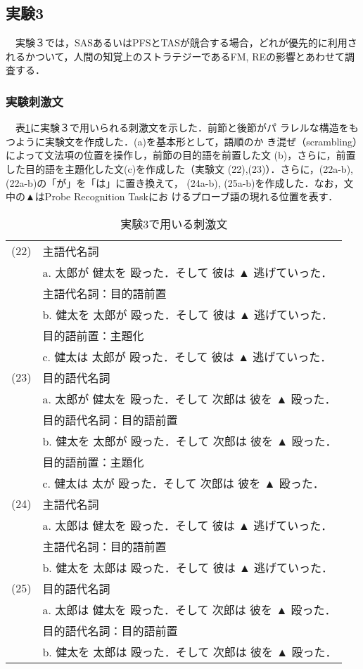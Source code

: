 \subsection{実験3}
　実験３では，SASあるいはPFSとTASが競合する場合，どれが優先的に利用さ
れるかついて，人間の知覚上のストラテジーであるFM, REの影響とあわせて調
査する．

\subsubsection{実験刺激文}
　表\ref{table:exam3s}に実験３で用いられる刺激文を示した．前節と後節がパ
ラレルな構造をもつように実験文を作成した．(a)を基本形として，語順のか
き混ぜ（scrambling）によって文法項の位置を操作し，前節の目的語を前置した文
(b)，さらに，前置した目的語を主題化した文(c)を作成した（実験文
(22),(23)）．さらに，(22a-b),(22a-b)の「が」を「は」に置き換えて，
(24a-b), (25a-b)を作成した．なお，文中の▲はProbe Recognition Taskにお
けるプローブ語の現れる位置を表す．

\begin{table}[htbp]

\caption{実験3で用いる刺激文}
\label{table:exam3s}
\begin{center}
\begin{tabular}{cl} \hline
(22) &主語代名詞\\
     & a. 太郎が 健太を 殴った．そして 彼は ▲ 逃げていった．\\
     &主語代名詞：目的語前置\\
     & b. 健太を 太郎が 殴った．そして 彼は ▲ 逃げていった．\\
     &目的語前置：主題化\\
     & c. 健太は 太郎が 殴った．そして 彼は ▲ 逃げていった．\\
(23) &目的語代名詞\\
     & a. 太郎が 健太を 殴った．そして 次郎は 彼を ▲ 殴った．\\
     &目的語代名詞：目的語前置\\
     & b. 健太を 太郎が 殴った．そして 次郎は 彼を ▲ 殴った．\\
     &目的語前置：主題化\\
     & c. 健太は 太が 殴った．そして 次郎は 彼を ▲ 殴った．\\
(24) &主語代名詞\\
     & a. 太郎は 健太を 殴った．そして 彼は ▲ 逃げていった．\\
     &主語代名詞：目的語前置\\
     & b. 健太を 太郎は 殴った．そして 彼は ▲ 逃げていった．\\
(25) &目的語代名詞\\
     & a. 太郎は 健太を 殴った．そして 次郎は 彼を ▲ 殴った．\\
     &目的語代名詞：目的語前置\\
     & b. 健太を 太郎は 殴った．そして 次郎は 彼を ▲ 殴った．\\ \hline
\end{tabular}
\end{center}
\end{table}

